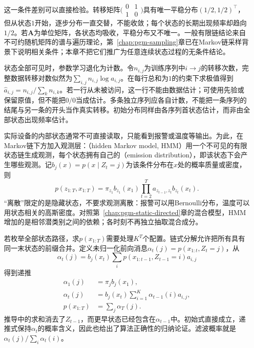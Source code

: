 这一条件差别可以直接检验。转移矩阵$\bigl(\begin{smallmatrix}0&1\\1&0\end{smallmatrix}\bigr)$具有唯一平稳分布$(1/2,1/2)^\top$，但从状态$1$开始，逐步分布一直交替，不能收敛；每个状态的长期出现频率却趋向$1/2$。若$\bm{A}$为单位矩阵，各状态均吸收，平稳分布又不唯一。一般有限链结论来自不可约随机矩阵的谱与遍历理论，第~\ref{chap:pgm-sampling}章已在Markov链采样背景下说明相关条件；本章不把它们推广为任意连续状态过程的无条件结论。

状态全部可见时，参数学习退化为计数。令$n_{i,j}$为训练序列中$i\to j$的转移次数，完整数据转移对数似然为$\sum_{i,j}n_{i,j}\log a_{i,j}$。在每行总和为$1$的约束下求极值得到$\widehat a_{i,j}=n_{i,j}/\sum_k n_{i,k}$。若一行从未被访问，这一行不能由数据估计；可使用先验或保留原值，但不能把$0/0$当成估计。多条独立序列应各自计数，不能把一条序列的结尾与另一条的开头当作真实转移。初始分布同样由各序列首状态估计，而非由全部状态出现频率估计。

实际设备的内部状态通常不可直接读取，只能看到报警或温度等输出。为此，在Markov链下方加入观测层：（hidden Markov model, HMM）用一个不可见的有限状态链生成观测，每个状态拥有自己的（emission distribution），即该状态下会产生哪些观测。记$b_j(x)=p(x\mid Z_t=j)$为该条件分布在$x$处的概率质量或密度，则
\begin{equation}
  p(z_{1:T},x_{1:T})
    =\pi_{z_1}b_{z_1}(x_1)
      \prod_{t=2}^{T}a_{z_{t-1},z_t}b_{z_t}(x_t).
  \label{eq:pgm-dynamic-hmm}
\end{equation}
“离散”限定的是隐藏状态，不要求观测离散：报警可以用Bernoulli分布，温度可以用状态相关的高斯密度。对照第~\ref{chap:pgm-static-directed}章的混合模型，HMM增加的是相邻潜类别之间的依赖；各时刻不再独立抽取混合成分。

若枚举全部状态路径，求$p(x_{1:T})$需要处理$K^T$个配置。链式分解允许把所有具有同一末状态的前缀合并。定义未归一化前向消息$\alpha_t(j)=p(x_{1:t},Z_t=j)$，从
\[
  \alpha_t(j)
    =b_j(x_t)\sum_i
      p(x_{1:t-1},Z_{t-1}=i)a_{i,j}
\]
得到递推
\begin{equation}
  \begin{aligned}
    \alpha_1(j)&=\pi_jb_j(x_1),\\
    \alpha_t(j)&=b_j(x_t)\sum_{i=1}^{K}
      \alpha_{t-1}(i)a_{i,j},\\
    p(x_{1:T})&=\sum_j\alpha_T(j).
  \end{aligned}
  \label{eq:pgm-dynamic-forward}
\end{equation}
推导中的求和消去了$Z_{t-1}$，而更早状态已经包含在$\alpha_{t-1}$中。初始式直接成立，递推式保持$\alpha_t$的概率含义，因此也给出了算法正确性的归纳论证。滤波概率就是$\alpha_t(j)/\sum_i\alpha_t(i)$。

